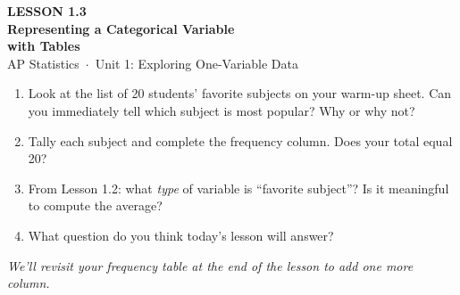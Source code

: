 \documentclass[aspectratio=169, 11pt]{beamer}
\begin{document}
{
\begin{frame}[plain]
  \vspace{2.8cm}
  \hspace{0.55cm}%
  \begin{minipage}{0.9\textwidth}
    {\color{goldacc}\bfseries\small LESSON 1.3}\\[0.5cm]
    {\color{white}\bfseries\LARGE Representing a Categorical Variable\\[0.25cm]
      with Tables}\\[1.4cm]
    {\color{skymid}\small AP Statistics~$\cdot$~Unit 1: Exploring One-Variable Data}
  \end{minipage}
\end{frame}
}

{
\begin{frame}[t, plain]
  \hspace{0.55cm}%
  \begin{minipage}{0.9\textwidth}
    \vspace{0.3em}
    \small

    \begin{enumerate}
      \setlength{\itemsep}{0.7em}\setlength{\topsep}{0em}
      \item Look at the list of 20 students' favorite subjects on your warm-up sheet.
            Can you immediately tell which subject is most popular? Why or why not?
      \item Tally each subject and complete the frequency column.
            Does your total equal 20?
      \item From Lesson 1.2: what \textit{type} of variable is ``favorite subject''?
            Is it meaningful to compute the average?
      \item What question do you think today's lesson will answer?
    \end{enumerate}

    \vspace{0.5cm}
    {\color{navy}\itshape\small
      We'll revisit your frequency table at the end of the lesson to add
      one more column.}
  \end{minipage}
\end{frame}
}
\end{document}
